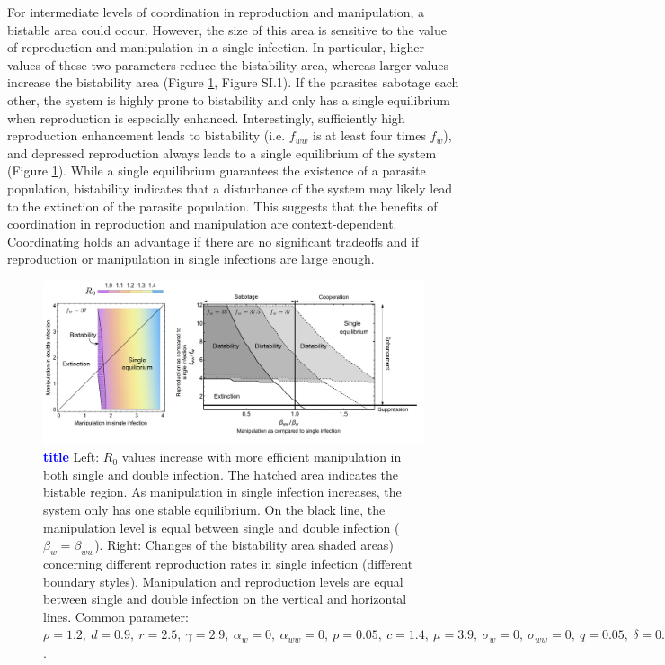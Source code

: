 \documentclass[a4paper]{scrartcl}
\newcommand{\cha}[1]{\textcolor{blue}{#1}}
\begin{document}
For intermediate levels of coordination in reproduction and manipulation, a bistable area could occur.
However, the size of this area is sensitive to the value of reproduction and manipulation in a single infection. 
In particular, higher values of these two parameters reduce the bistability area, whereas larger values increase the bistability area (Figure \ref{fig:manipbifur}, Figure SI.1).
If the parasites sabotage each other, the system is highly prone to bistability and only has a single equilibrium when reproduction is especially enhanced.
Interestingly, sufficiently high reproduction enhancement leads to bistability (i.e. $f_{ww}$ is at least four times $f_w$), and depressed reproduction always leads to a single equilibrium of the system (Figure \ref{fig:manipbifur}). 
While a single equilibrium guarantees the existence of a parasite population, bistability indicates that a disturbance of the system may likely lead to the extinction of the parasite population. 
This suggests that the benefits of coordination in reproduction and manipulation are context-dependent. 
Coordinating holds an advantage if there are no significant tradeoffs and if reproduction or manipulation in single infections are large enough. 

\begin{figure}[!ht]
\captionsetup{format=plain}
\centering
\includegraphics[width=\textwidth]{Figures/ratio_reproduction_manipulation_combi.pdf}
\caption{\cha{\textbf{title}}
Left: $R_0$ values increase with more efficient manipulation in both single and double infection.  The hatched area indicates the bistable region. 
As manipulation in single infection increases, the system only has one stable equilibrium. 
On the black line, the manipulation level is equal between single and double infection ($\beta_w = \beta_{ww}$). 
Right: Changes of the bistability area shaded areas) concerning different reproduction rates in single infection (different boundary styles). 
Manipulation and reproduction levels are equal between single and double infection on the vertical and horizontal lines. 
Common parameter:  $\rho = 1.2, \ d = 0.9, \ r = 2.5, \ \gamma = 2.9, \ \alpha_w = 0, \ \alpha_{ww} = 0, \ p = 0.05, \ c = 1.4, \ \mu = 3.9, \ \sigma_w = 0, \ \sigma_{ww} = 0, \ q = 0.05, \ \delta = 0.9, \ k = 0.26, \  \beta_w = 1.65, h = 0.6$.}
\label{fig:manipbifur}
\end{figure}
\end{document}
